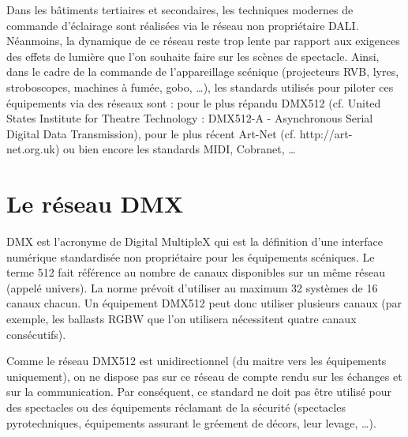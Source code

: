 Dans les bâtiments tertiaires et secondaires, 
les techniques modernes de commande d’éclairage sont réalisées via le réseau non propriétaire DALI.
Néanmoins, la dynamique de ce réseau reste trop lente par rapport aux exigences
des effets de lumière que l’on souhaite faire sur les scènes de spectacle. Ainsi,
dans le cadre de la commande de l’appareillage scénique (projecteurs RVB, lyres,
stroboscopes, machines à fumée, gobo, \dots), les standards utilisés pour piloter ces
équipements via des réseaux sont : pour le plus répandu DMX512 (cf. United States
Institute for Theatre Technology : DMX512-A - Asynchronous Serial Digital Data
Transmission), pour le plus récent Art-Net (cf. http://art-net.org.uk) ou bien
encore les standards MIDI, Cobranet, \dots


\section{Le réseau DMX}

DMX est l’acronyme de Digital MultipleX qui est la définition d’une interface
numérique standardisée non propriétaire pour les équipements scéniques. Le terme 512
fait référence au nombre de canaux disponibles sur un même réseau (appelé univers). La
norme prévoit d'utiliser au maximum 32 systèmes de 16 canaux chacun. Un équipement
DMX512 peut donc utiliser plusieurs canaux (par exemple, les ballasts RGBW que l’on
utilisera nécessitent quatre canaux consécutifs).

Comme le réseau DMX512 est unidirectionnel (du maitre vers les équipements uniquement), on ne dispose pas sur
ce réseau de compte rendu sur les échanges et sur la communication. Par conséquent, ce standard ne doit pas être
utilisé pour des spectacles ou des équipements réclamant de la sécurité (spectacles pyrotechniques, équipements
assurant le gréement de décors, leur levage, \dots).

